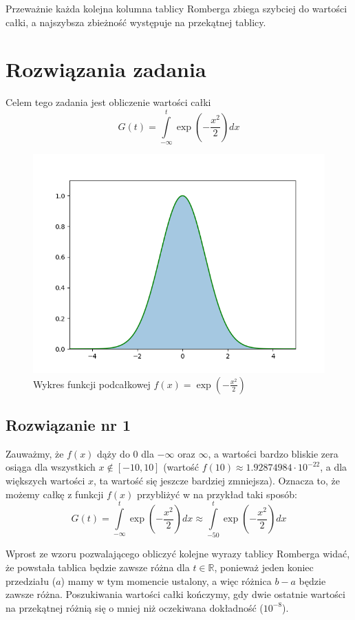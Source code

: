 \documentclass[a4paper,12pt]{article}
\begin{document}
\noindent Przeważnie każda kolejna kolumna tablicy Romberga zbiega szybciej
do wartości całki, a najszybsza zbieżność występuje na przekątnej tablicy.

\newpage
\section{Rozwiązania zadania}
Celem tego zadania jest obliczenie wartości całki 
\[
    G(t) = \int\limits_{-\infty}^{t} \exp \left( - \frac{x^2}{2} \right) dx
\]
\begin{figure}[H]
    \includegraphics[width=\textwidth]{"./Pomocnicze/zadanie1a"}
    \centering
    \caption{Wykres funkcji podcałkowej $f(x) = \exp \left( - \frac{x^2}{2} \right)$}
\end{figure}

\subsection{Rozwiązanie nr 1}
Zauważmy, że $f(x)$ dąży do 0 dla $-\infty$ oraz $\infty$, a wartości bardzo bliskie 
zera osiąga dla wszystkich $x \notin [-10, 10]$ (wartość $f(10) \approx 1.92874984
\cdot 10^{-22}$, a dla większych wartości $x$, ta wartość się jeszcze bardziej 
zmniejsza). Oznacza to, że możemy całkę z funkcji $f(x)$ przybliżyć w na przykład
taki sposób:
\[
    G(t) = \int\limits_{-\infty}^{t} \exp \left( - \frac{x^2}{2} \right) dx
    \approx \int\limits_{-50}^{t} \exp \left( - \frac{x^2}{2} \right) dx
\]

\noindent Wprost ze wzoru pozwalającego obliczyć kolejne wyrazy tablicy Romberga
widać, że powstała tablica będzie zawsze różna dla $t \in \mathbb{R}$, ponieważ
jeden koniec przedziału ($a$) mamy w tym momencie ustalony, a więc różnica $b-a$
będzie zawsze różna. Poszukiwania wartości całki kończymy, gdy dwie ostatnie
wartości na przekątnej różnią się o mniej niż oczekiwana dokładność ($10^{-8}$).
\end{document}

